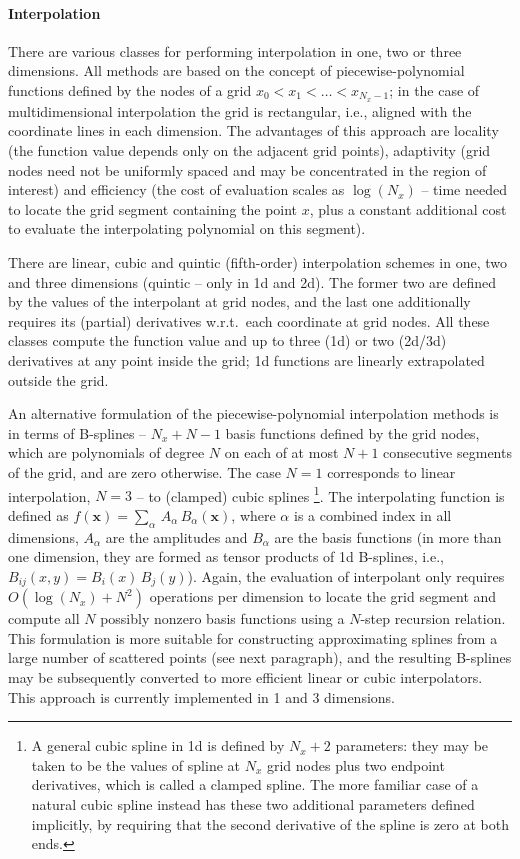 \documentclass[12pt]{article}
\newcommand{\bx}{\boldsymbol{x}}
\let\oldparagraph\paragraph
\renewcommand{\paragraph}[1]{\vspace{-2mm}\oldparagraph{#1}}
\begin{document}
\paragraph{Interpolation} \label{sec:SplineInterpolation}
There are various classes for performing interpolation in one, two or three dimensions.
All methods are based on the concept of piecewise-polynomial functions defined by the nodes of a grid $x_0<x_1<\dots<x_{N_x-1}$; in the case of multidimensional interpolation the grid is rectangular, i.e., aligned with the coordinate lines in each dimension. The advantages of this approach are locality (the function value depends only on the adjacent grid points), adaptivity (grid nodes need not be uniformly spaced and may be concentrated in the region of interest) and efficiency (the cost of evaluation scales as $\log(N_x)$ -- time needed to locate the grid segment containing the point $x$, plus a constant additional cost to evaluate the interpolating polynomial on this segment).

There are linear, cubic and quintic (fifth-order) interpolation schemes in one, two and three dimensions (quintic -- only in 1d and 2d). The former two are defined by the values of the interpolant at grid nodes, and the last one additionally requires its (partial) derivatives w.r.t.\ each coordinate at grid nodes. All these classes compute the function value and up to three (1d) or two (2d/3d) derivatives at any point inside the grid; 1d functions are linearly extrapolated outside the grid.

An alternative formulation of the piecewise-polynomial interpolation methods is in terms of B-splines -- $N_x+N-1$ basis functions defined by the grid nodes, which are polynomials of degree $N$ on each of at most $N+1$ consecutive segments of the grid, and are zero otherwise. The case $N=1$ corresponds to linear interpolation, $N=3$ -- to (clamped) cubic splines%
\footnote{A general cubic spline in 1d is defined by $N_x+2$ parameters: they may be taken to be the values of spline at $N_x$ grid nodes plus two endpoint derivatives, which is called a clamped spline. The more familiar case of a natural cubic spline instead has these two additional parameters defined implicitly, by requiring that the second derivative of the spline is zero at both ends.}.
The interpolating function is defined as $f(\bx) = \sum_\alpha\,A_\alpha\,B_\alpha(\bx)$, where $\alpha$ is a combined index in all dimensions, $A_\alpha$ are the amplitudes and $B_\alpha$ are the basis functions (in more than one dimension, they are formed as tensor products of 1d B-splines, i.e., $B_{ij}(x,y) = B_i(x)\,B_j(y)$). Again, the evaluation of interpolant only requires $O(\log(N_x)+N^2)$ operations per dimension to locate the grid segment and compute all $N$ possibly nonzero basis functions using a $N$-step recursion relation. This formulation is more suitable for constructing approximating splines from a large number of scattered points (see next paragraph), and the resulting B-splines may be subsequently converted to more efficient linear or cubic interpolators. This approach is currently implemented in 1 and 3 dimensions.
\end{document}
